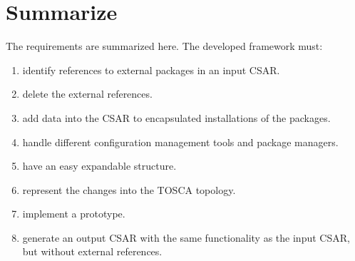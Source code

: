 \section*{Summarize}
The requirements are summarized here. 
The developed framework must:
\begin{enumerate}
	\item identify references to external packages in an input CSAR.\label{req:identify}
	\item delete the external references.\label{req:delete}
	\item add data into the CSAR to encapsulated installations of the packages.\label{req:adddata}
	\item handle different configuration management tools and package managers.\label{req:handledif}
	\item have an easy expandable structure.\label{req:expand}
	\item represent the changes into the TOSCA topology.\label{req:represent}
	\item implement a prototype.
	\item generate an output CSAR with the same functionality as the input CSAR, but without external references.\label{req:out}
\end{enumerate}
